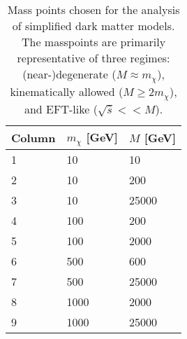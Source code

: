 \begin{flushleft}
\begin{table}[!htbp]
\centering
\begin{tabular}{l|l|l}
\hline
\hline
 \rule{0pt}{2.2ex}Column & $m_{\chi}$ [GeV] & $M$ [GeV]\\
\hline
 \rule{0pt}{2.2ex}1 & 10 & 10\\
 2 & 10 & 200\\
 3 & 10 & 25000\\
 4 & 100 & 200\\
 5 & 100 & 2000\\
 6 & 500 & 600\\
 7 & 500 & 25000\\
 8 & 1000 & 2000\\
 9 & 1000 & 25000\\
 \hline
 \hline
\end{tabular}
\caption{Mass points chosen for the analysis of simplified dark matter models. The masspoints are primarily representative of three regimes: (near-)degenerate ($M\approx m_{\chi}$), kinematically allowed ($M \geq 2m_{\chi}$), and EFT-like ($\sqrt{\hat{s}} << M$).}
\label{Mass_coup_points}
\end{table}
\end{flushleft}


